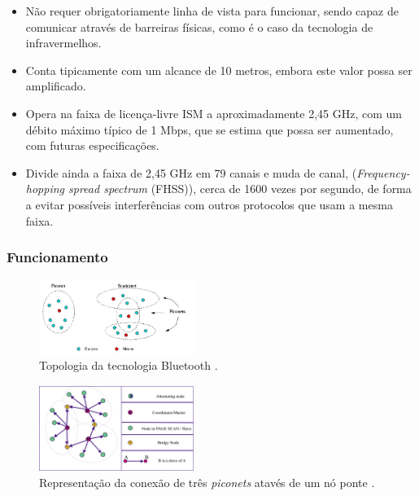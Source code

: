\documentclass[conference]{IEEEtran}
\begin{document}
\begin{itemize}

 \item Não requer obrigatoriamente linha de vista para funcionar, sendo capaz de comunicar através de barreiras físicas, como é o caso da tecnologia de infravermelhos.
 \item Conta tipicamente com um alcance de 10 metros, embora este valor possa ser amplificado. 
 \item Opera na faixa de licença-livre ISM a aproximadamente 2,45 GHz, com um débito máximo típico de 1 Mbps, que se estima que possa ser aumentado, com futuras especificações.
 \item Divide ainda a faixa de 2,45 GHz em 79 canais e muda de canal, (\textit{Frequency-hopping spread spectrum} (FHSS)), cerca de 1600 vezes por segundo, de forma a evitar possíveis interferências com outros protocolos que usam a mesma faixa.

\end{itemize}

\subsubsection{Funcionamento}

\begin{figure}[!t]
  \centering
  \includegraphics[width=0.45\textwidth]{Esquema_Bluetooth.png}
  \caption{Topologia da tecnologia Bluetooth \cite{blueesptec}.}
  \label{fig:topBluet}
\end{figure}

\begin{figure}[!t]
  \centering
  \includegraphics[width=0.45\textwidth]{no_ponte.png}
  \caption{Representação da conexão de três \textit{piconets} atavés de um nó ponte \cite{salonidis2005distributed}.}
  \label{fig:noPonte}
\end{figure}
\end{document}
